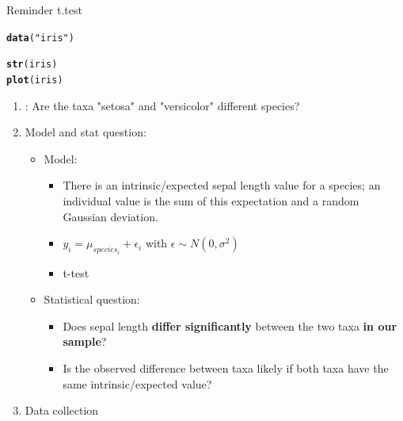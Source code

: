 \documentclass[10pt]{beamer}\usepackage[]{graphicx}\usepackage[]{color}
\makeatletter
\newcommand{\hlstr}[1]{\textcolor[rgb]{0.192,0.494,0.8}{#1}}%
\newcommand{\hlstd}[1]{\textcolor[rgb]{0.345,0.345,0.345}{#1}}%
\newcommand{\hlkwd}[1]{\textcolor[rgb]{0.737,0.353,0.396}{\textbf{#1}}}%
\newenvironment{kframe}{%
 \def\at@end@of@kframe{}%
 \ifinner\ifhmode%
  \def\at@end@of@kframe{\end{minipage}}%
  \begin{minipage}{\columnwidth}%
 \fi\fi%
 \def\FrameCommand##1{\hskip\@totalleftmargin \hskip-\fboxsep
 \colorbox{shadecolor}{##1}\hskip-\fboxsep
     \hskip-\linewidth \hskip-\@totalleftmargin \hskip\columnwidth}%
 \MakeFramed {\advance\hsize-\width
   \@totalleftmargin\z@ \linewidth\hsize
   \@setminipage}}%
 {\par\unskip\endMakeFramed%
 \at@end@of@kframe}
\newenvironment{knitrout}{}{} %
\makeatother
\begin{document}
\begin{frame}[fragile]{Reminder t.test}
  
  \pause
\begin{knitrout}
\color{fgcolor}\begin{kframe}
\begin{alltt}
  \hlkwd{data}\hlstd{(}\hlstr{"iris"}\hlstd{)}
\end{alltt}
\end{kframe}
\end{knitrout}

\begin{knitrout}
\color{fgcolor}\begin{kframe}
\begin{alltt}
  \hlkwd{str}\hlstd{(iris)}
  \hlkwd{plot}\hlstd{(iris)}
\end{alltt}
\end{kframe}
\end{knitrout}
  
  \begin{enumerate}
    \item \color{red}{Scientific question}: Are the taxa "setosa" and "versicolor" different species?
  \pause
    \item Model and stat question:
      \begin{itemize}
        \item Model:
          \begin{itemize}
            \item There is an intrinsic/expected sepal length value for a species; an individual value is the sum of this expectation and a random Gaussian deviation.
            \item $y_i = \mu_{species_i} + \epsilon_i$ with  $\epsilon \sim N(0,\sigma^2)$
            \item t-test
          \end{itemize}
        \pause
        \item Statistical question: 
          \begin{itemize}
            \item Does sepal length \textbf{differ significantly} between the two taxa \textbf{in our sample}?
            \item Is the observed difference between taxa likely if both taxa have the same intrinsic/expected value?
          \end{itemize}
        \end{itemize}
      \item Data collection
    \end{enumerate}
\end{frame}
\end{document}
